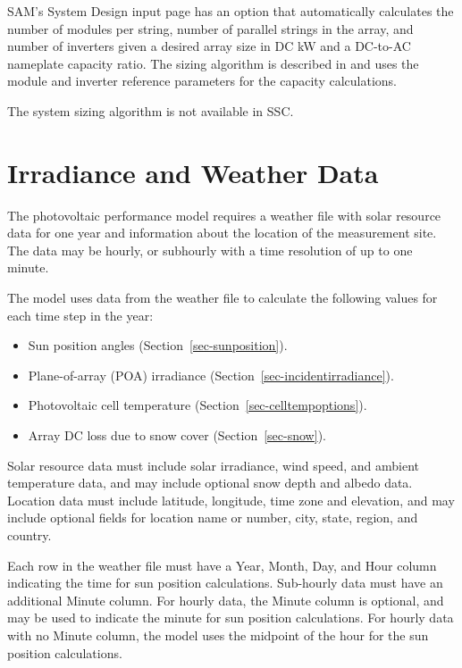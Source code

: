 \documentclass[12pt,letterpaper]{article}
\begin{document}
SAM's System Design input page has an option that automatically calculates the number of modules per string, number of parallel strings in the array, and number of inverters given a desired array size in DC kW and a DC-to-AC nameplate capacity ratio. The sizing algorithm is described in \citet{help-sizing} and uses the module and inverter reference parameters for the capacity calculations.

The system sizing algorithm is not available in SSC.

\chapter{Irradiance and Weather Data}\label{sec-irradianceweatherdata}

The photovoltaic performance model requires a weather file with solar resource data for one year and information about the location of the measurement site. The data may be hourly, or subhourly with a time resolution of up to one minute.

The model uses data from the weather file to calculate the following values for each time step in the year:

\begin{itemize}
\item Sun position angles (Section~\ref{sec-sunposition}).
\item Plane-of-array (POA) irradiance (Section~\ref{sec-incidentirradiance}).
\item Photovoltaic cell temperature (Section~\ref{sec-celltempoptions}).
\item Array DC loss due to snow cover (Section~\ref{sec-snow}).
\end{itemize}

Solar resource data must include solar irradiance, wind speed, and ambient temperature data, and may include optional snow depth and albedo data. Location data must include latitude, longitude, time zone and elevation, and may include optional fields for location name or number, city, state, region, and country. 

Each row in the weather file must have a Year, Month, Day, and Hour column indicating the time for sun position calculations. Sub-hourly data must have an additional Minute column. For hourly data, the Minute column is optional, and may be used to indicate the minute for sun position calculations. For hourly data with no Minute column, the model uses the midpoint of the hour for the sun position calculations.
\end{document}
